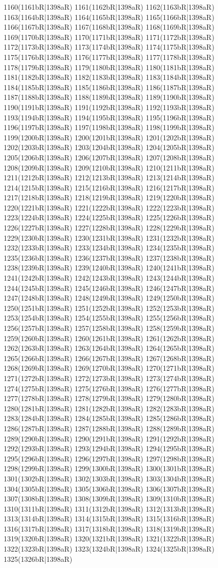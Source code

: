 1160(1161bR|1398aR) 1161(1162bR|1398aR) 1162(1163bR|1398aR) 1163(1164bR|1398aR) 1164(1165bR|1398aR) 1165(1166bR|1398aR) 1166(1167bR|1398aR) 1167(1168bR|1398aR) 1168(1169bR|1398aR) 1169(1170bR|1398aR) 1170(1171bR|1398aR) 1171(1172bR|1398aR) 1172(1173bR|1398aR) 1173(1174bR|1398aR) 1174(1175bR|1398aR) 1175(1176bR|1398aR) 1176(1177bR|1398aR) 1177(1178bR|1398aR) 1178(1179bR|1398aR) 1179(1180bR|1398aR) 1180(1181bR|1398aR) 1181(1182bR|1398aR) 1182(1183bR|1398aR) 1183(1184bR|1398aR) 1184(1185bR|1398aR) 1185(1186bR|1398aR) 1186(1187bR|1398aR) 1187(1188bR|1398aR) 1188(1189bR|1398aR) 1189(1190bR|1398aR) 1190(1191bR|1398aR) 1191(1192bR|1398aR) 1192(1193bR|1398aR) 1193(1194bR|1398aR) 1194(1195bR|1398aR) 1195(1196bR|1398aR) 1196(1197bR|1398aR) 1197(1198bR|1398aR) 1198(1199bR|1398aR) 1199(1200bR|1398aR) 1200(1201bR|1398aR) 1201(1202bR|1398aR) 1202(1203bR|1398aR) 1203(1204bR|1398aR) 1204(1205bR|1398aR) 1205(1206bR|1398aR) 1206(1207bR|1398aR) 1207(1208bR|1398aR) 1208(1209bR|1398aR) 1209(1210bR|1398aR) 1210(1211bR|1398aR) 1211(1212bR|1398aR) 1212(1213bR|1398aR) 1213(1214bR|1398aR) 1214(1215bR|1398aR) 1215(1216bR|1398aR) 1216(1217bR|1398aR) 1217(1218bR|1398aR) 1218(1219bR|1398aR) 1219(1220bR|1398aR) 1220(1221bR|1398aR) 1221(1222bR|1398aR) 1222(1223bR|1398aR) 1223(1224bR|1398aR) 1224(1225bR|1398aR) 1225(1226bR|1398aR) 1226(1227bR|1398aR) 1227(1228bR|1398aR) 1228(1229bR|1398aR) 1229(1230bR|1398aR) 1230(1231bR|1398aR) 1231(1232bR|1398aR) 1232(1233bR|1398aR) 1233(1234bR|1398aR) 1234(1235bR|1398aR) 1235(1236bR|1398aR) 1236(1237bR|1398aR) 1237(1238bR|1398aR) 1238(1239bR|1398aR) 1239(1240bR|1398aR) 1240(1241bR|1398aR) 1241(1242bR|1398aR) 1242(1243bR|1398aR) 1243(1244bR|1398aR) 1244(1245bR|1398aR) 1245(1246bR|1398aR) 1246(1247bR|1398aR) 1247(1248bR|1398aR) 1248(1249bR|1398aR) 1249(1250bR|1398aR) 1250(1251bR|1398aR) 1251(1252bR|1398aR) 1252(1253bR|1398aR) 1253(1254bR|1398aR) 1254(1255bR|1398aR) 1255(1256bR|1398aR) 1256(1257bR|1398aR) 1257(1258bR|1398aR) 1258(1259bR|1398aR) 1259(1260bR|1398aR) 1260(1261bR|1398aR) 1261(1262bR|1398aR) 1262(1263bR|1398aR) 1263(1264bR|1398aR) 1264(1265bR|1398aR) 1265(1266bR|1398aR) 1266(1267bR|1398aR) 1267(1268bR|1398aR) 1268(1269bR|1398aR) 1269(1270bR|1398aR) 1270(1271bR|1398aR) 1271(1272bR|1398aR) 1272(1273bR|1398aR) 1273(1274bR|1398aR) 1274(1275bR|1398aR) 1275(1276bR|1398aR) 1276(1277bR|1398aR) 1277(1278bR|1398aR) 1278(1279bR|1398aR) 1279(1280bR|1398aR) 1280(1281bR|1398aR) 1281(1282bR|1398aR) 1282(1283bR|1398aR) 1283(1284bR|1398aR) 1284(1285bR|1398aR) 1285(1286bR|1398aR) 1286(1287bR|1398aR) 1287(1288bR|1398aR) 1288(1289bR|1398aR) 1289(1290bR|1398aR) 1290(1291bR|1398aR) 1291(1292bR|1398aR) 1292(1293bR|1398aR) 1293(1294bR|1398aR) 1294(1295bR|1398aR) 1295(1296bR|1398aR) 1296(1297bR|1398aR) 1297(1298bR|1398aR) 1298(1299bR|1398aR) 1299(1300bR|1398aR) 1300(1301bR|1398aR) 1301(1302bR|1398aR) 1302(1303bR|1398aR) 1303(1304bR|1398aR) 1304(1305bR|1398aR) 1305(1306bR|1398aR) 1306(1307bR|1398aR) 1307(1308bR|1398aR) 1308(1309bR|1398aR) 1309(1310bR|1398aR) 1310(1311bR|1398aR) 1311(1312bR|1398aR) 1312(1313bR|1398aR) 1313(1314bR|1398aR) 1314(1315bR|1398aR) 1315(1316bR|1398aR) 1316(1317bR|1398aR) 1317(1318bR|1398aR) 1318(1319bR|1398aR) 1319(1320bR|1398aR) 1320(1321bR|1398aR) 1321(1322bR|1398aR) 1322(1323bR|1398aR) 1323(1324bR|1398aR) 1324(1325bR|1398aR) 1325(1326bR|1398aR) 